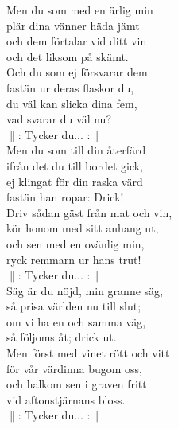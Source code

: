 \documentclass[a6paper,10pt]{article}
\begin{document}
\begin{lyrics}
\newpage
\setlength{\oddsidemargin}{-0.37in}
\noindent
Men du som med en ärlig min\\
plär dina vänner häda jämt\\
och dem förtalar vid ditt vin\\
och det liksom på skämt.\\
Och du som ej försvarar dem\\
fastän ur deras flaskor du,\\
du väl kan slicka dina fem,\\
vad svarar du väl nu?
\vspace{5pt}\\
$\|$: Tycker du... :$\|$
\vspace{5pt}\\
Men du som till din återfärd\\
ifrån det du till bordet gick,\\
ej klingat för din raska värd\\
fastän han ropar: Drick!\\
Driv sådan gäst från mat och vin,\\
kör honom med sitt anhang ut,\\
och sen med en ovänlig min,\\
ryck remmarn ur hans trut!
\vspace{5pt}\\
$\|$: Tycker du... :$\|$
\vspace{5pt}\\
Säg är du nöjd, min granne säg,\\
så prisa världen nu till slut;\\
om vi ha en och samma väg,\\
så följoms åt; drick ut.\\
Men först med vinet rött och vitt\\
för vår värdinna bugom oss,\\
och halkom sen i graven fritt\\
vid aftonstjärnans bloss.
\vspace{5pt}\\
$\|$: Tycker du... :$\|$
\end{lyrics}
\end{document}
